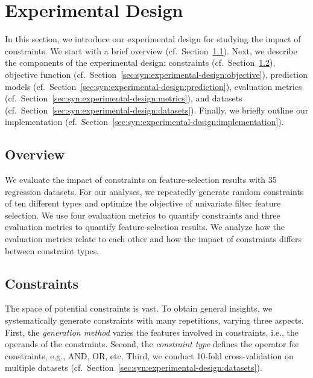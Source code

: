 \section{Experimental Design}
\label{sec:syn:experimental-design}

In this section, we introduce our experimental design for studying the impact of constraints.
We start with a brief overview (cf.~Section~\ref{sec:syn:experimental-design:overview}).
Next, we describe the components of the experimental design: constraints (cf.~Section~\ref{sec:syn:experimental-design:constraints}), objective function (cf.~Section~\ref{sec:syn:experimental-design:objective}), prediction models (cf.~Section~\ref{sec:syn:experimental-design:prediction}), evaluation metrics (cf.~Section~\ref{sec:syn:experimental-design:metrics}), and datasets (cf.~Section~\ref{sec:syn:experimental-design:datasets}).
Finally, we briefly outline our implementation (cf.~Section~\ref{sec:syn:experimental-design:implementation}).

\subsection{Overview}
\label{sec:syn:experimental-design:overview}

We evaluate the impact of constraints on feature-selection results with 35 regression datasets.
For our analyses, we repeatedly generate random constraints of ten different types and optimize the objective of univariate filter feature selection.
We use four evaluation metrics to quantify constraints and three evaluation metrics to quantify feature-selection results.
We analyze how the evaluation metrics relate to each other and how the impact of constraints differs between constraint types.

\subsection{Constraints}
\label{sec:syn:experimental-design:constraints}

The space of potential constraints is vast.
To obtain general insights, we systematically generate constraints with many repetitions, varying three aspects.
First, the \emph{generation method} varies the features involved in constraints, i.e., the operands of the constraints.
Second, the \emph{constraint type} defines the operator for constraints, e.g., AND, OR, etc.
Third, we conduct 10-fold cross-validation on multiple datasets (cf.~Section~\ref{sec:syn:experimental-design:datasets}).

